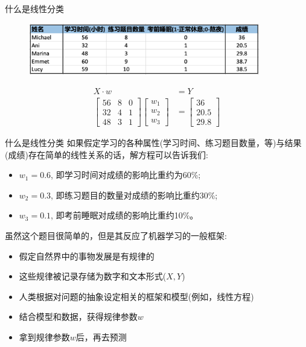 \documentclass[handout]{ctexbeamer}
\begin{document}
\begin{frame}{什么是线性分类}
	\begin{figure}[H]
		\centering
		\includegraphics[width=0.9\textwidth]{fig/C1C2grade}
	\end{figure}
	\begin{example}
	\begin{align*}
		X \cdot w & = Y \\
		\begin{bmatrix}
		56 & 8 & 0 \\
		32 & 4 & 1 \\
		48 & 3 & 1 
	\end{bmatrix} \begin{bmatrix}
		w_1 \\
		w_2 \\
		w_3
	\end{bmatrix} & = \begin{bmatrix}
		36 \\
		20.5 \\
		29.8 
	\end{bmatrix}
	\end{align*}	
	\end{example}
\end{frame}

\begin{frame}{什么是线性分类}
	如果假定学习的各种属性(学习时间、练习题目数量，等)与结果(成绩)存在简单的线性关系的话，解方程可以告诉我们:
\begin{itemize}
	\item $w_1 = 0.6$, 即学习时间对成绩的影响比重约为60\%;
	\item $w_2 = 0.3$, 即练习题目的数量对成绩的影响比重约30\%;
	\item $w_3 = 0.1$, 即考前睡眠对成绩的影响比重约10\%。
\end{itemize}

虽然这个题目很简单的，但是其反应了机器学习的一般框架:
\begin{itemize}
	\item 假定自然界中的事物发展是有规律的
	\item 这些规律被记录存储为数字和文本形式($X, Y$)
	\item 人类根据对问题的抽象设定相关的框架和模型(例如，线性方程)
	\item 结合模型和数据，获得规律参数$w$
	\item 拿到规律参数$w$后，再去预测
\end{itemize}
\end{frame}
\end{document}
